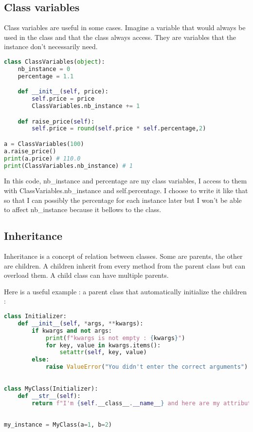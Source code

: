 \documentclass[a4paper, 12pt, titlepage]{scrartcl} %
\begin{document}
\subsection{Class variables}
Class variables are useful in some cases. Imagine a variable that would always be used in the class and that the class always access. They are variables that the instance don't necessarily need.
\begin{lstlisting}[language=Python]
class ClassVariables(object):
	nb_instance = 0
	percentage = 1.1

	def __init__(self, price):
		self.price = price
		ClassVariables.nb_instance += 1

	def raise_price(self):
		self.price = round(self.price * self.percentage,2)

a = ClassVariables(100)
a.raise_price()
print(a.price) # 110.0
print(ClassVariables.nb_instance) # 1
\end{lstlisting} \vspace{5mm}
In this code, nb\_instance and percentage are my class variables, I access to them with ClassVariables.nb\_instance and self.percentage. I choose to write it like that so that I can possibly the percentage for each instance later but I won't be able to affect nb\_instance because it bellows to the class.

\subsection{Inheritance}
Inheritance is a concept of relation between classes. Some are parents, the other are children. A children inherit from every method from the parent class but can overload them. A child class can have multiple parents.

\vspace{5mm}

Here is a useful example : a parent class that automatically initialize the children :

\begin{lstlisting}[language=Python]
class Initializer:
    def __init__(self, *args, **kwargs):
        if kwargs and not args:
            print(f"kwargs is not empty : {kwargs}")
            for key, value in kwargs.items():
                setattr(self, key, value)
        else:
            raise ValueError("You didn't enter the correct arguments")
 
 
class MyClass(Initializer):
    def __str__(self):
        return f"I'm {self.__class__.__name__} and here are my attributes : {self.__dict__}"
 
 
my_instance = MyClass(a=1, b=2)
\end{lstlisting} \vspace{5mm}
\end{document}
